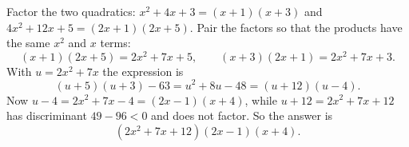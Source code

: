 Factor the two quadratics: $x^2+4x+3=(x+1)(x+3)$ and $4x^2+12x+5=(2x+1)(2x+5)$. Pair the factors so that the products have the same $x^2$ and $x$ terms:
\[
(x+1)(2x+5)=2x^2+7x+5,\qquad(x+3)(2x+1)=2x^2+7x+3 .
\]
With $u=2x^2+7x$ the expression is
\[
(u+5)(u+3)-63=u^2+8u-48=(u+12)(u-4).
\]
Now $u-4=2x^2+7x-4=(2x-1)(x+4)$, while $u+12=2x^2+7x+12$ has discriminant $49-96<0$ and does not factor. So the answer is
\[
\boxed{\left(2x^2+7x+12\right)(2x-1)(x+4)}.
\]

